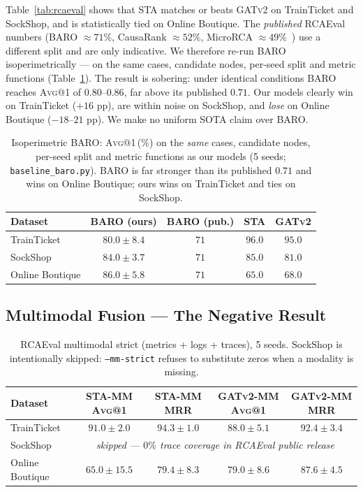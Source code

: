 \documentclass[11pt,a4paper]{article}
\makeatletter
\newcommand{\Avg}[1]{\textsc{Avg}@{#1}}
\newcommand{\MRR}{\textsc{MRR}}
\newcommand{\STA}{\textsc{STA}}
\newcommand{\GATv}{\textsc{GATv2}}
\makeatother
\begin{document}
Table~\ref{tab:rcaeval} shows that \STA{} matches or beats \GATv{} on
TrainTicket and SockShop, and is statistically tied on Online Boutique. The
\emph{published} RCAEval numbers (BARO $\approx 71\%$, CausaRank $\approx 52\%$,
MicroRCA $\approx 49\%$~\cite{pham2024rcaeval}) use a different split and are only
indicative. We therefore re-run BARO isoperimetrically --- on the same cases,
candidate nodes, per-seed split and metric functions
(Table~\ref{tab:baro-iso}). The result is sobering: under identical conditions
BARO reaches \Avg{1} of $0.80$--$0.86$, far above its published $0.71$. Our
models clearly win on TrainTicket ($+16$ pp), are within noise on SockShop, and
\emph{lose} on Online Boutique ($-18$--$21$ pp). We make no uniform SOTA claim
over BARO.

\begin{table}[t]
\centering\small
\begin{tabular}{lcccc}
\toprule
\textbf{Dataset} & BARO (ours) & BARO (pub.) & \STA{} & \GATv{} \\
\midrule
TrainTicket     & $80.0 \pm 8.4$ & $71$ & $\mathbf{96.0}$ & $95.0$ \\
SockShop        & $84.0 \pm 3.7$ & $71$ & $\mathbf{85.0}$ & $81.0$ \\
Online Boutique & $\mathbf{86.0 \pm 5.8}$ & $71$ & $65.0$ & $68.0$ \\
\bottomrule
\end{tabular}
\caption{Isoperimetric BARO: \Avg{1}\,(\%) on the \emph{same} cases, candidate
nodes, per-seed split and metric functions as our models (5 seeds;
\texttt{baseline\_baro.py}). BARO is far stronger than its published $0.71$ and
wins on Online Boutique; ours wins on TrainTicket and ties on SockShop.}
\label{tab:baro-iso}
\end{table}

\subsection{Multimodal Fusion --- The Negative Result}
\label{sec:mm}

\begin{table}[t]
\centering\small
\begin{tabular}{lcccc}
\toprule
\textbf{Dataset} & \STA{}-MM \Avg{1} & \STA{}-MM \MRR{} & \GATv{}-MM \Avg{1} & \GATv{}-MM \MRR{} \\
\midrule
TrainTicket     & $91.0 \pm 2.0$  & $94.3 \pm 1.0$  & $88.0 \pm 5.1$  & $92.4 \pm 3.4$ \\
SockShop        & \multicolumn{4}{c}{\emph{skipped --- $0\%$ trace coverage in RCAEval public release}} \\
Online Boutique & $65.0 \pm 15.5$ & $79.4 \pm 8.3$  & $\mathbf{79.0 \pm 8.6}$ & $\mathbf{87.6 \pm 4.5}$ \\
\bottomrule
\end{tabular}
\caption{RCAEval multimodal strict (metrics + logs + traces), 5 seeds.
SockShop is intentionally skipped: \texttt{--mm-strict} refuses to
substitute zeros when a modality is missing.}
\label{tab:rcaeval-mm}
\end{table}
\end{document}
